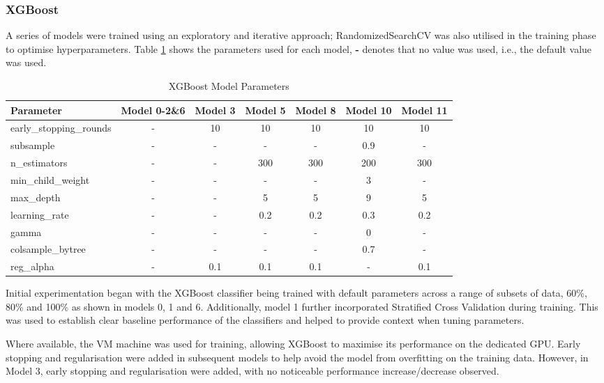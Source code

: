  \newpage

\subsubsection{XGBoost}
\label{sec:xgboost}

A series of models were trained using an exploratory and iterative approach; RandomizedSearchCV was also utilised in the training phase to optimise hyperparameters. Table \ref{tab:xgboost-parameters} shows the parameters used for each model, \textbf{-} denotes that no value was used, i.e., the default value was used.

\begin{table}[h]
  \centering
  \caption{XGBoost Model Parameters}
  \label{tab:xgboost-parameters}
  \begin{tabular}{lcccccc}
    \toprule
    Parameter & Model 0-2\&6 & Model 3 & Model 5 & Model 8 & Model 10 & Model 11 \\
    \midrule
    early\_stopping\_rounds & - & 10 & 10 & 10 & 10 & 10 \\
    subsample & - & - & - & - & 0.9 & - \\
    n\_estimators & - & - & 300 & 300 & 200 & 300 \\
    min\_child\_weight & - & - & - & - & 3 & - \\
    max\_depth & - & - & 5 & 5 & 9 & 5 \\
    learning\_rate & - & - & 0.2 & 0.2 & 0.3 & 0.2 \\
    gamma & - & - & - & - & 0 & - \\
    colsample\_bytree & - & - & - & - & 0.7 & - \\
    reg\_alpha & - & 0.1 & 0.1 & 0.1 & - & 0.1 \\
    \bottomrule
  \end{tabular}
\end{table}


\medskip

Initial experimentation began with the XGBoost classifier being trained with default parameters across a range of subsets of data, 60\%, 80\% and 100\% as shown in models 0, 1 and 6. Additionally, model 1 further incorporated Stratified Cross Validation during training. This was used to establish clear baseline performance of the classifiers and helped to provide context when tuning parameters.

Where available, the VM machine was used for training, allowing XGBoost to maximise its performance on the dedicated GPU. Early stopping and regularisation were added in subsequent models to help avoid the model from overfitting on the training data. However, in Model 3, early stopping and regularisation were added, with no noticeable performance increase/decrease observed. 

